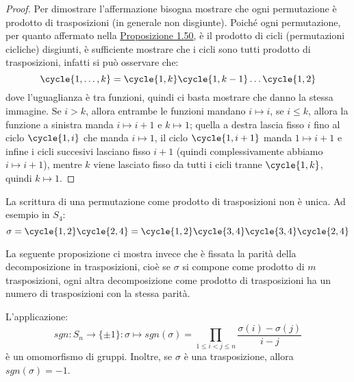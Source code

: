 \documentclass[11pt]{scrartcl}
\begin{document}
\begin{proof}
    Per dimostrare l'affermazione bisogna mostrare che ogni permutazione è prodotto di trasposizioni (in generale non disgiunte).
    Poiché ogni permutazione, per quanto affermato nella \hyperref[perm]{Proposizione 1.50}, è il prodotto di cicli (permutazioni cicliche) disgiunti,
    è sufficiente mostrare che i cicli sono tutti prodotto di trasposizioni, infatti si può osservare che:
        \[ \cycle{1,\ldots,k} = \cycle{1,k}\cycle{1,k-1}\ldots\cycle{1,2}
            \]
    dove l'uguaglianza è tra funzioni, quindi ci basta mostrare che danno la stessa immagine. Se $i>k$, allora entrambe le funzioni mandano $i \longmapsto i$, se 
    $i \leq k$, allora la funzione a sinistra manda $i \longmapsto i+1$ e $k \longmapsto 1$; quella a destra lascia fisso $i$ fino al ciclo $\cycle{1,i}$ che manda $i \longmapsto 1$, 
    il ciclo $\cycle{1,i+1}$ manda $1 \longmapsto i+1$ e infine i cicli succesivi lasciano fisso $i+1$ (quindi complessivamente abbiamo $i \longmapsto i+1$), 
    mentre $k$ viene lasciato fisso da tutti i cicli tranne $\cycle{1,k}$, quindi $k \longmapsto 1$.
\end{proof}

\begin{remark}
    La scrittura di una permutazione come prodotto di trasposizioni non è unica. Ad esempio in $S_4$:
        \[ \sigma = \cycle{1,2}\cycle{2,4} = \cycle{1,2}\cycle{3,4}\cycle{3,4}\cycle{2,4}
            \]
\end{remark}

La seguente proposizione ci mostra invece che è fissata la parità della decomposizione in trasposizioni, cioè se $\sigma$ si compone come prodotto di $m$ trasposizioni,
ogni altra decomposizione come prodotto di trasposizioni ha un numero di trasposizioni con la stessa parità.

\begin{proposition}
    L'applicazione:
        \[ sgn : S_n \longrightarrow \{\pm1\} : \sigma \longmapsto sgn(\sigma) = \prod_{1 \leq i < j \leq n} \frac{\sigma(i) - \sigma(j)}{i - j}
            \]
    è un omomorfismo di gruppi. Inoltre, se $\sigma$ è una trasposizione, allora $sgn(\sigma) = -1$.
\end{proposition}
\end{document}
